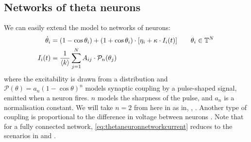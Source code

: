 \subsection{Networks of theta neurons}
We can easily extend the model to networks of neurons:
\begin{align}
\dot{\theta}_{i} &=\left(1-\cos \theta_{i}\right)+\left(1+\cos \theta_{i}\right) \cdot \left[\eta_{i} + \kappa \cdot I_{i}(t)\right] \qquad \theta_i \in \T^N  \label{eq:thetaneuronnetwork} \\
I_{i}(t) &=\frac{1}{\kmean} \sum_{j=1}^{N} A_{i j} \cdot \mathcal{P}_{n}(\theta_{j}) \label{eq:thetaneuronnetworkcurrent}
\end{align}
where the excitability is drawn from a distribution and $\mathcal{P}(\theta)  = a_n(1 - \cos \theta)^n$ models synaptic coupling by a pulse-shaped signal, emitted when a neuron fires. $n$ models the sharpness of the pulse, and $a_n$ is a normalisation constant. We will take $n=2$ from here in as in\cite{Luke2013}, \cite{OttAntonsen2017}, \cite{Martens2020}. Another type of coupling is proportional to the difference in voltage between neurons \cite{Martens2020}. Note that for a fully connected network, \eqref{eq:thetaneuronnetworkcurrent} reduces to the scenarios in \cite{Luke2013} and \cite{Martens2020}.


